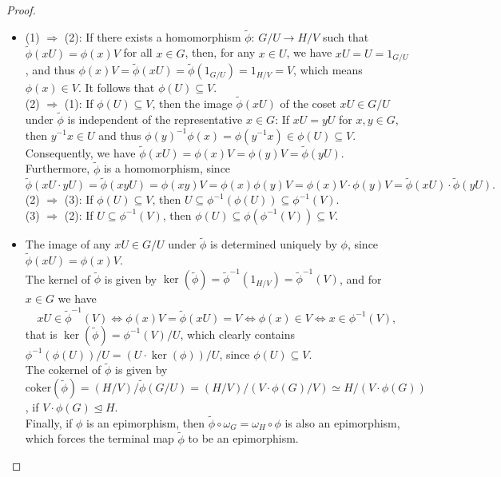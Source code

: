 \documentclass{amsart}
\theoremstyle{definition}
\numberwithin{equation}{section}
\begin{document}
\begin{proof}
\begin{itemize}
\item
(1) \(\Longrightarrow\) (2):
If there exists a homomorphism \(\tilde{\phi}:\,G/U\to H/V\)
such that \(\tilde{\phi}(xU)=\phi(x)V\) for all \(x\in G\),
then, for any \(x\in U\), we have \(xU=U=1_{G/U}\),
and thus \(\phi(x)V=\tilde{\phi}(xU)=\tilde{\phi}(1_{G/U})=1_{H/V}=V\),
which means \(\phi(x)\in V\).
It follows that \(\phi(U)\subseteq V\).\\
(2) \(\Longrightarrow\) (1):
If \(\phi(U)\subseteq V\),
then the image \(\tilde{\phi}(xU)\) of the coset \(xU\in G/U\) under \(\tilde{\phi}\)
is independent of the representative \(x\in G\):
If \(xU=yU\) for \(x,y\in G\), then \(y^{-1}x\in U\) and thus
\(\phi(y)^{-1}\phi(x)=\phi(y^{-1}x)\in\phi(U)\subseteq V\).
Consequently, we have \(\tilde{\phi}(xU)=\phi(x)V=\phi(y)V=\tilde{\phi}(yU)\).
Furthermore, \(\tilde{\phi}\) is a homomorphism, since
\[\tilde{\phi}(xU\cdot yU)=\tilde{\phi}(xyU)=\phi(xy)V=
\phi(x)\phi(y)V=\phi(x)V\cdot\phi(y)V=\tilde{\phi}(xU)\cdot\tilde{\phi}(yU).\]
(2) \(\Longrightarrow\) (3):
If \(\phi(U)\subseteq V\), then
\(U\subseteq\phi^{-1}(\phi(U))\subseteq\phi^{-1}(V)\).\\
(3) \(\Longrightarrow\) (2):
If \(U\subseteq\phi^{-1}(V)\), then
\(\phi(U)\subseteq\phi(\phi^{-1}(V))\subseteq V\).
\item
The image of any \(xU\in G/U\) under \(\tilde{\phi}\)
is determined uniquely by \(\phi\), since
\(\tilde{\phi}(xU)=\phi(x)V\).\\
The kernel of \(\tilde{\phi}\) is given by
\(\ker(\tilde{\phi})=\tilde{\phi}^{-1}(1_{H/V})=\tilde{\phi}^{-1}(V)\),
and for \(x\in G\) we have
\[xU\in\tilde{\phi}^{-1}(V)\Longleftrightarrow\phi(x)V=\tilde{\phi}(xU)=V
\Longleftrightarrow\phi(x)\in V\Longleftrightarrow x\in\phi^{-1}(V),\]
that is \(\ker(\tilde{\phi})=\phi^{-1}(V)/U\),
which clearly contains \(\phi^{-1}(\phi(U))/U=(U\cdot\ker(\phi))/U\),
since \(\phi(U)\subseteq V\).\\
The cokernel of \(\tilde{\phi}\) is given by
\(\mathrm{coker}(\tilde{\phi})=(H/V)/\tilde{\phi}(G/U)=(H/V)/(V\cdot\phi(G)/V)\simeq H/(V\cdot\phi(G))\), if \(V\cdot\phi(G)\unlhd H\).\\
Finally, if \(\phi\) is an epimorphism, then
\(\tilde{\phi}\circ\omega_G=\omega_H\circ\phi\) is also an epimorphism,
which forces the terminal map \(\tilde{\phi}\) to be an epimorphism.
\end{itemize}
\end{proof}
\end{document}
